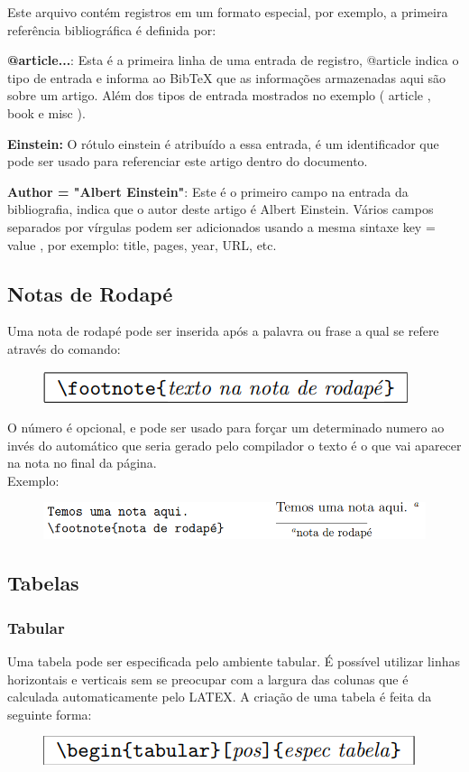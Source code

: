 \documentclass[12pt]{article}
\begin{document}
			Este arquivo contém registros em um formato especial, por exemplo, a primeira referência bibliográfica é definida por:
			
			\textbf{@article{...}}:
			Esta é a primeira linha de uma entrada de registro, @article indica o tipo de entrada e informa ao BibTeX que as informações armazenadas aqui são sobre um artigo. Além dos tipos de entrada mostrados no exemplo ( article , book e misc ).
			
			\textbf{Einstein:}
			O rótulo einstein é atribuído a essa entrada, é um identificador que pode ser usado para referenciar este artigo dentro do documento.
			
			\textbf{Author = "Albert Einstein"}:
			Este é o primeiro campo na entrada da bibliografia, indica que o autor deste artigo é Albert Einstein. Vários campos separados por vírgulas podem ser adicionados usando a mesma sintaxe key = value , por exemplo: title, pages, year, URL, etc.
		
		\subsection{Notas de Rodapé}
			Uma nota de rodapé pode ser inserida após a palavra ou frase a qual se refere através do comando:
			\begin{figure}[h]
				\centering
				\includegraphics[scale=0.5]{no.png}
			\end{figure}
			
			O número é opcional, e pode ser usado para forçar um determinado numero ao invés do automático que seria gerado pelo compilador o texto é o que vai aparecer na nota no final da página.\\
			Exemplo:
			\begin{figure}[h]
				\centering
				\includegraphics[scale=0.45]{xx.png}
			\end{figure}
		
		\subsection{Tabelas}
		
				\subsubsection{Tabular}
					Uma tabela pode ser especificada pelo ambiente tabular. É possível utilizar linhas horizontais e verticais sem se preocupar com a largura das colunas que é calculada automaticamente pelo LATEX. A criação de uma tabela é feita da seguinte forma:
					\begin{figure}[h]
						\centering
						\includegraphics[scale=0.45]{t.png}
					\end{figure}
		
\end{document}
